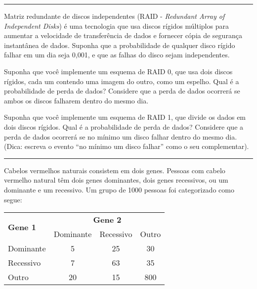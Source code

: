 \documentclass[a4paper,11pt,fleqn]{article}\usepackage[]{graphicx}\usepackage[]{color}
\theoremstyle{definition}
\begin{document}
\begin{compactenum}
\vspace{0.3cm}
\hrule
\vspace{0.3cm}

\item Matriz redundante de discos independentes (RAID -
  \textit{Redundant Array of Independent Disks}) é uma tecnologia que
  usa discos rígidos múltiplos para aumentar a velocidade de
  transferência de dados e fornecer cópia de segurança instantânea de
  dados. Suponha que a probabilidade de qualquer disco rígido falhar em
  um dia seja 0,001, e que as falhas do disco sejam independentes.
  \begin{compactenum}
  \item Suponha que você implemente um esquema de RAID 0, que usa dois
    discos rígidos, cada um contendo uma imagem do outro, como um
    espelho. Qual é a probabilidade de perda de dados? Considere que a
    perda de dados ocorrerá se ambos os discos falharem dentro do mesmo
    dia.
  \item Suponha que você implemente um esquema de RAID 1, que divide os
    dados em dois discos rígidos. Qual é a probabilidade de perda de
    dados? Considere que a perda de dados ocorrerá se no mínimo um disco
    falhar dentro do mesmo dia. (Dica: escreva o evento ``no mínimo um
    disco falhar'' como o seu complementar).
  \end{compactenum}

\vspace{0.3cm}
\hrule
\vspace{0.3cm}

\item Cabelos vermelhos naturais consistem em dois genes. Pessoas com
  cabelo vermelho natural têm dois genes dominantes, dois genes
  recessivos, ou um dominante e um recessivo. Um grupo de 1000 pessoas
  foi categorizado como segue:
  \begin{table}[!h]
    \centering
    \begin{tabular}{lccc}
      \hline
      \multirow{2}{*}{\textbf{Gene 1}}
      & \multicolumn{3}{c}{\textbf{Gene 2}} \\
      \cline{2-4}
                & Dominante      & Recessivo & Outro  \\
      \hline
      Dominante     & 5           & 25 & 30           \\
      Recessivo    & 7           & 63 & 35           \\
      Outro    & 20           & 15 & 800   \\
      \hline
    \end{tabular}
  \end{table}


\end{compactenum}
\end{document}
